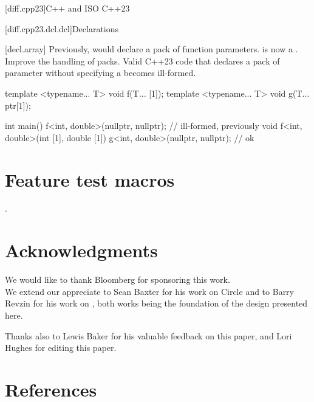 \documentclass{wg21}
\begin{document}
\begin{addedblock}

[diff.cpp23]{C++ and ISO C++23}

[diff.cpp23.dcl.dcl]{Declarations}

[decl.array]
\change
Previously,  would declare a pack of function parameters.
 is now a .
\rationale
Improve the handling of packs.
\effect
Valid C++23 code that declares a pack of parameter without specifying a  becomes ill-formed.

\begin{codeblock}
template <typename... T>
void f(T... [1]);
template <typename... T>
void g(T... ptr[1]);

int main() {
    f<int, double>(nullptr, nullptr); // ill-formed, previously void f<int, double>(int [1], double [1])
    g<int, double>(nullptr, nullptr); // ok
}
\end{codeblock}

\begin{colorblock}

\end{colorblock}

\end{addedblock}

\section{Feature test macros}

.


\section{Acknowledgments}

We would like to thank Bloomberg for sponsoring this work.\\

We extend our appreciate to Sean Baxter for his work on Circle and to Barry Revzin  for his work on , both works being the foundation of the design presented here.

Thanks also to Lewis Baker for his valuable feedback on this paper, and Lori Hughes for editing this paper.

\section{References} %
\end{document}

